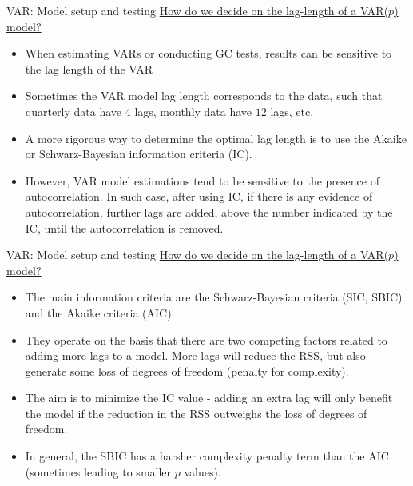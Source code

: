 \documentclass[usenames,dvipsnames]{beamer}
\begin{document}
\begin{frame}{VAR: Model setup and testing}
\small
\underline{How do we decide on the lag-length of a VAR($p$) model?}
\vspace*{2mm}
\begin{itemize}
\item When estimating VARs or conducting GC tests, results can be sensitive to the lag length of the VAR
\item Sometimes the VAR model lag length corresponds to the data, such that quarterly data have $4$ lags, monthly data have $12$ lags, etc.
\item A more rigorous way to determine the optimal lag length is to use the Akaike or Schwarz-Bayesian information criteria (IC).
\item However, VAR model estimations tend to be sensitive to the presence of autocorrelation. In such case, after using IC, if there is any evidence of autocorrelation, further lags are added, above the number indicated by the IC, until the autocorrelation is removed.
\end{itemize}
\end{frame}
\begin{frame}{VAR: Model setup and testing}
\small
\underline{How do we decide on the lag-length of a VAR($p$) model?}
\vspace*{2mm}
\begin{itemize}
\item The main information criteria are the Schwarz-Bayesian criteria (SIC, SBIC) and the Akaike criteria (AIC).
\item They operate on the basis that there are two competing factors related to adding more lags to a model. More lags will reduce the RSS, but also generate some loss of degrees of freedom (penalty for complexity).
\item The aim is to minimize the IC value - adding an extra lag will only benefit the model if the reduction in the RSS outweighs the loss of degrees of freedom.
\item In general, the SBIC has a harsher complexity penalty term than the AIC (sometimes leading to smaller $p$ values).
\end{itemize}
\end{frame}
\end{document}
